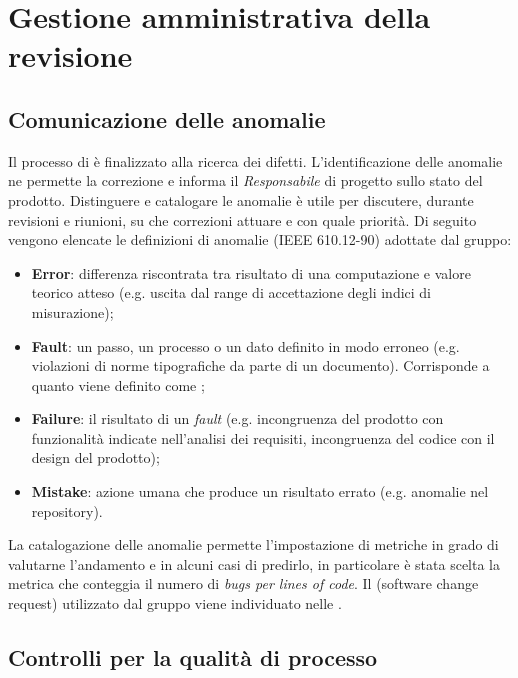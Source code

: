 \section{Gestione amministrativa della revisione}

	\subsection{Comunicazione delle anomalie}
	\label{DefinizioneAnomalie}

	Il processo di  è finalizzato alla ricerca dei difetti. L'identificazione delle anomalie ne permette la correzione e informa il \emph{Responsabile} di progetto sullo stato del prodotto. Distinguere e catalogare le anomalie è utile per discutere, durante revisioni e riunioni, su che correzioni attuare e con quale priorità. Di seguito vengono elencate le definizioni di anomalie (IEEE 610.12-90) adottate dal gruppo:
	\begin{itemize}
		\item \textbf{Error}: differenza riscontrata tra risultato di una computazione e valore teorico atteso (e.g. uscita dal range di accettazione degli indici di misurazione);
		\item \textbf{Fault}: un passo, un processo o un dato definito in modo erroneo (e.g. violazioni di norme tipografiche da parte di un documento). Corrisponde a quanto viene definito come ;
		\item \textbf{Failure}: il risultato di un \emph{fault} (e.g. incongruenza del prodotto con funzionalità indicate nell'analisi dei requisiti, incongruenza del codice con il design del prodotto);
		\item \textbf{Mistake}: azione umana che produce un risultato errato (e.g. anomalie nel repository).
	\end{itemize}
	La catalogazione delle anomalie permette l'impostazione di metriche in grado di valutarne l'andamento e in alcuni casi di predirlo, in particolare è stata scelta la metrica che conteggia il numero di \emph{bugs per lines of code}. Il  (software change request) utilizzato dal gruppo viene individuato nelle \NormeDiProgetto.


	\subsection{Controlli per la qualità di processo}

